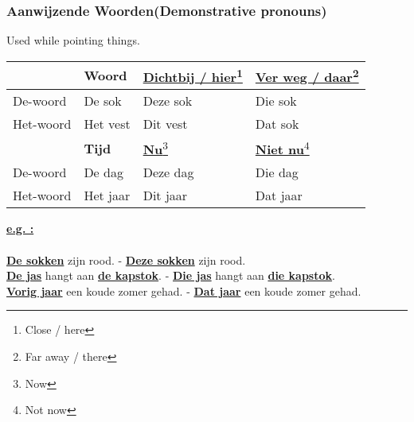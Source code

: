 \documentclass[a4paper,14pt]{extarticle}
\newcommand{\note}[2]{\underline{\textbf{#1}}\footnote{#2}}
\newcommand{\emp}[1]{\underline{\textbf{#1}}}
\begin{document}
\subsubsection{Aanwijzende Woorden(Demonstrative pronouns)}
Used while pointing things.
\begin{center}
\begin{tabularx}{\textwidth}{p{} p{} p{} p{}}
 \hline
  & \textbf{Woord} & \note{Dichtbij / hier}{Close / here} & \note{Ver weg / daar}{Far away / there}\\
 \hline
 De-woord & De sok & Deze sok & Die sok \\
 Het-woord & Het vest & Dit vest & Dat sok \\
 \hline
  & \textbf{Tijd} & \note{Nu}{Now} & \note{Niet nu}{Not now}\\
 \hline
 De-woord & De dag& Deze dag & Die dag \\
 Het-woord & Het jaar & Dit jaar & Dat jaar \\
\end{tabularx}
\end{center}
\emp{e.g. :} \\\\
\emp{De sokken} zijn rood. - \emp{Deze sokken} zijn rood. \\
\emp{De jas} hangt aan \emp{de kapstok}. - \emp{Die jas} hangt aan \emp{die kapstok}. \\
\emp{Vorig jaar} een koude zomer gehad. - \emp{Dat jaar} een koude zomer gehad. \\
\end{document}

